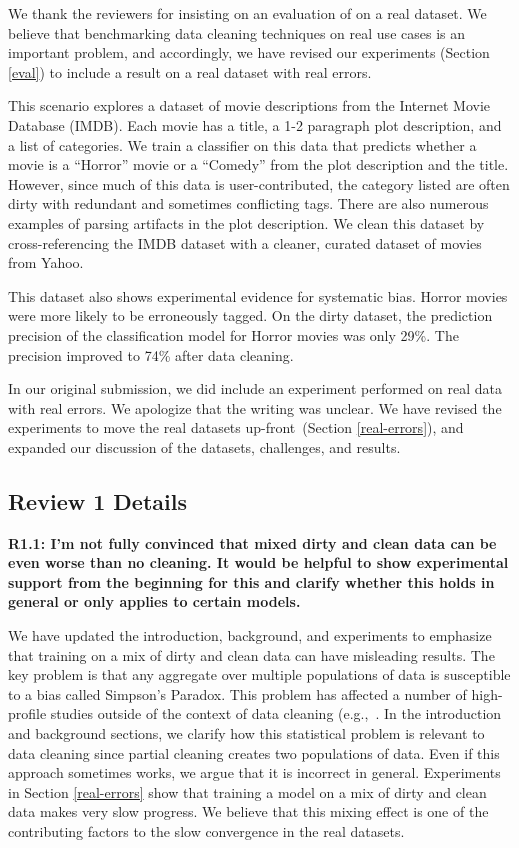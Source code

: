 \vspace{0.5em}

We thank the reviewers for insisting on an evaluation of \sys on a real dataset. We believe that benchmarking data cleaning techniques on real use cases is an important problem, and accordingly, we have revised our experiments (Section \ref{eval}) to include a result on a real dataset with real errors. 

This scenario explores a dataset of movie descriptions from the Internet Movie Database (IMDB). 
Each movie has a title, a 1-2 paragraph plot description, and a list of categories.
We train a classifier on this data that predicts whether a movie is a ``Horror'' movie or a ``Comedy'' from the plot description and the title.
However, since much of this data is user-contributed, the category listed are often dirty with redundant and sometimes conflicting tags.
There are also numerous examples of parsing artifacts in the plot description.
We clean this dataset by cross-referencing the IMDB dataset with a cleaner, curated dataset of movies from Yahoo.

This dataset also shows experimental evidence for systematic bias.
Horror movies were more likely to be erroneously tagged. 
On the dirty dataset, the prediction precision of the classification model for Horror movies was only 29\%.
The precision improved to 74\% after data cleaning.

In our original submission, we did include an experiment performed on real data with real errors. 
We apologize that the writing was unclear. We have revised the experiments to move the real datasets up-front~(Section \ref{real-errors}), and expanded our discussion of the datasets, challenges, and results.

\subsection*{Review 1 Details} 

\noindent\textbf{R1.1: I'm not fully convinced that mixed dirty and clean data can be even worse than no cleaning. It would be helpful to show experimental support from the beginning for this and clarify whether this holds in general or only applies to certain models.}

\noindent We have updated the introduction, background, and experiments to emphasize that training on a mix of dirty and clean data can have misleading results.
The key problem is that any aggregate over multiple populations of data is susceptible to a bias called Simpson's Paradox. 
This problem has affected a number of high-profile studies outside of the context of data cleaning (e.g.,~\cite{bickel1975sex, charig1986comparison}. 
In the introduction and background sections, we clarify how this statistical problem is relevant to data cleaning since partial cleaning creates two populations of data. 
Even if this approach sometimes works, we argue that it is incorrect in general.
Experiments in Section \ref{real-errors} show that training a model on a mix of dirty and clean data makes very slow progress. 
We believe that this mixing effect is one of the contributing factors to the slow convergence in the real datasets.

